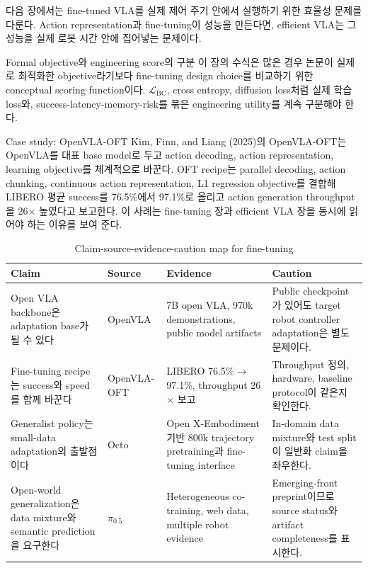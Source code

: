 다음 장에서는 fine-tuned VLA를 실제 제어 주기 안에서 실행하기 위한 효율성 문제를 다룬다. Action representation과 fine-tuning이 성능을 만든다면, efficient VLA는 그 성능을 실제 로봇 시간 안에 집어넣는 문제이다.

\begin{warningbox}{Formal objective와 engineering score의 구분}
이 장의 수식은 많은 경우 논문이 실제로 최적화한 objective라기보다 fine-tuning design choice를 비교하기 위한 conceptual scoring function이다. \(\mathcal{L}_{\mathrm{BC}}\), cross entropy, diffusion loss처럼 실제 학습 loss와, success-latency-memory-risk를 묶은 engineering utility를 계속 구분해야 한다.
\end{warningbox}

\begin{casebox}{Case study: OpenVLA-OFT}
Kim, Finn, and Liang (2025)의 OpenVLA-OFT는 OpenVLA를 대표 base model로 두고 action decoding, action representation, learning objective를 체계적으로 바꾼다. OFT recipe는 parallel decoding, action chunking, continuous action representation, L1 regression objective를 결합해 LIBERO 평균 success를 76.5\%에서 97.1\%로 올리고 action generation throughput을 26\(\times\) 높였다고 보고한다. 이 사례는 fine-tuning 장과 efficient VLA 장을 동시에 읽어야 하는 이유를 보여 준다.
\end{casebox}

\begin{table}[t]
  \centering
  \small
  \caption{Claim-source-evidence-caution map for fine-tuning}
  \label{tab:ch5_claim_source}
  \begin{tabularx}{\textwidth}{L{31mm}L{28mm}L{48mm}Y}
    \toprule
    Claim & Source & Evidence & Caution \\
    \midrule
    Open VLA backbone은 adaptation base가 될 수 있다 & OpenVLA \citep{openvla} & 7B open VLA, 970k demonstrations, public model artifacts & Public checkpoint가 있어도 target robot controller adaptation은 별도 문제이다. \\
    Fine-tuning recipe는 success와 speed를 함께 바꾼다 & OpenVLA-OFT \citep{openvlaoft} & LIBERO 76.5\%\(\rightarrow\)97.1\%, throughput 26\(\times\) 보고 & Throughput 정의, hardware, baseline protocol이 같은지 확인한다. \\
    Generalist policy는 small-data adaptation의 출발점이다 & Octo \citep{octo} & Open X-Embodiment 기반 800k trajectory pretraining과 fine-tuning interface & In-domain data mixture와 test split이 일반화 claim을 좌우한다. \\
    Open-world generalization은 data mixture와 semantic prediction을 요구한다 & \(\pi_{0.5}\) \citep{pi05} & Heterogeneous co-training, web data, multiple robot evidence & Emerging-front preprint이므로 source status와 artifact completeness를 표시한다. \\
    \bottomrule
  \end{tabularx}
\end{table}

